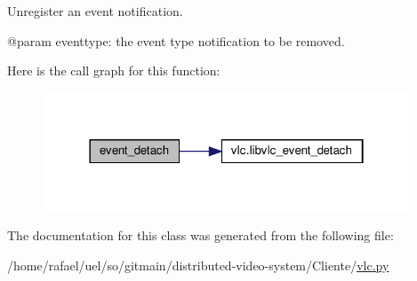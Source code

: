 \begin{DoxyVerb}Unregister an event notification.

@param eventtype: the event type notification to be removed.
\end{DoxyVerb}
 Here is the call graph for this function\+:
\nopagebreak
\begin{figure}[H]
\begin{center}
\leavevmode
\includegraphics[width=310pt]{classvlc_1_1_event_manager_a9163e98110a74e53366cecc73ac10a55_cgraph}
\end{center}
\end{figure}


The documentation for this class was generated from the following file\+:\begin{DoxyCompactItemize}
\item 
/home/rafael/uel/so/gitmain/distributed-\/video-\/system/\+Cliente/\hyperlink{vlc_8py}{vlc.\+py}\end{DoxyCompactItemize}
